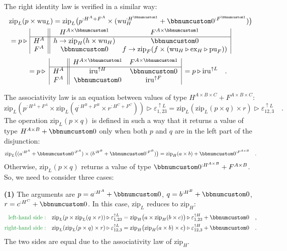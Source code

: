 The right identity law is verified in a similar way:
\begin{align*}
 & \text{zip}_{L}(p\times\text{wu}_{L})=\text{zip}_{L}\big(p^{:H^{A}+F^{A}}\times(\text{wu}_{H}^{:H^{\bbnum 1}}+\bbnum 0^{:F^{\bbnum 1}})\big)\\
 & =p\triangleright\,\begin{array}{|c||cc|}
 & H^{A\times\bbnum 1} & F^{A\times\bbnum 1}\\
\hline H^{A} & h\rightarrow\text{zip}_{H}(h\times\text{wu}_{H}) & \bbnum 0\\
F^{A} & \bbnum 0 & f\rightarrow\text{zip}_{F}(f\times(\text{wu}_{H}\triangleright\text{ex}_{H}\triangleright\text{pu}_{F}))
\end{array}
\end{align*}
\begin{align*}
 & =p\triangleright\,\,\begin{array}{|c||cc|}
 & H^{A\times\bbnum 1} & F^{A\times\bbnum 1}\\
\hline H^{A} & \text{iru}^{\uparrow H} & \bbnum 0\\
F^{A} & \bbnum 0 & \text{iru}^{\uparrow F}
\end{array}\,=p\triangleright\text{iru}^{\uparrow L}\quad.
\end{align*}

The associativity law is an equation between values of type $H^{A\times B\times C}+F^{A\times B\times C}$:
\[
\text{zip}_{L}(p^{:H^{A}+F^{A}}\times\text{zip}_{L}(q^{:H^{B}+F^{B}}\times r^{:H^{C}+F^{C}}))\triangleright\varepsilon_{1,23}^{\uparrow L}=\text{zip}_{L}(\text{zip}_{L}(p\times q)\times r)\triangleright\varepsilon_{12,3}^{\uparrow L}\quad.
\]
The operation $\text{zip}_{L}(p\times q)$ is defined in such a way
that it returns a value of type $H^{A\times B}+\bbnum 0$ only when
both $p$ and $q$ are in the left part of the disjunction:
\[
\text{zip}_{L}\big((a^{:H^{A}}+\bbnum 0^{:F^{A}})\times(b^{:H^{B}}+\bbnum 0^{:F^{B}})\big)=\text{zip}_{H}(a\times b)+\bbnum 0^{:F^{A\times B}}\quad.
\]
Otherwise, $\text{zip}_{L}(p\times q)$ returns a value of type $\bbnum 0^{:H^{A\times B}}+F^{A\times B}$.
So, we need to consider three cases:

\textbf{(1)} The arguments are $p=a^{:H^{A}}+\bbnum 0$, $q=b^{:H^{B}}+\bbnum 0$,
$r=c^{:H^{C}}+\bbnum 0$. In this case, $\text{zip}_{L}$ reduces
to $\text{zip}_{H}$:
\begin{align*}
{\color{greenunder}\text{left-hand side}:}\quad & \text{zip}_{L}(p\times\text{zip}_{L}(q\times r))\triangleright\varepsilon_{1,23}^{\uparrow L}=\text{zip}_{H}\big(a\times\text{zip}_{H}(b\times c)\big)\triangleright\varepsilon_{1,23}^{\uparrow H}+\bbnum 0\quad,\\
{\color{greenunder}\text{right-hand side}:}\quad & \text{zip}_{L}(\text{zip}_{L}(p\times q)\times r)\triangleright\varepsilon_{12,3}^{\uparrow L}=\text{zip}_{H}\big(\text{zip}_{H}(a\times b)\times c\big)\triangleright\varepsilon_{12,3}^{\uparrow H}+\bbnum 0\quad.
\end{align*}
The two sides are equal due to the associativity law of $\text{zip}_{H}$.

